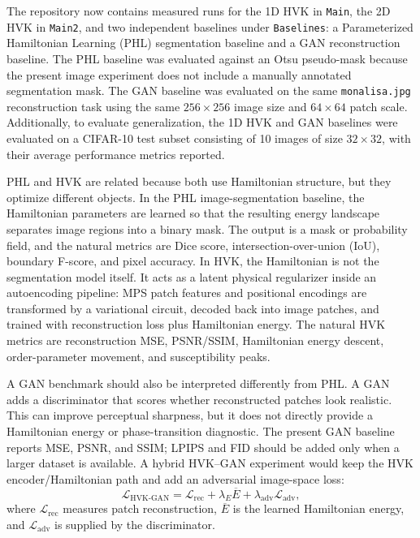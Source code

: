 \documentclass[11pt]{article}
\begin{document}
The repository now contains measured runs for the 1D HVK in \texttt{Main}, the 2D HVK in \texttt{Main2}, and two independent baselines under \texttt{Baselines}: a Parameterized Hamiltonian Learning (PHL) segmentation baseline and a GAN reconstruction baseline. The PHL baseline was evaluated against an Otsu pseudo-mask because the present image experiment does not include a manually annotated segmentation mask. The GAN baseline was evaluated on the same \texttt{monalisa.jpg} reconstruction task using the same $256\times256$ image size and $64\times64$ patch scale. Additionally, to evaluate generalization, the 1D HVK and GAN baselines were evaluated on a CIFAR-10 test subset consisting of 10 images of size $32\times32$, with their average performance metrics reported.

PHL and HVK are related because both use Hamiltonian structure, but they optimize different objects. In the PHL image-segmentation baseline, the Hamiltonian parameters are learned so that the resulting energy landscape separates image regions into a binary mask. The output is a mask or probability field, and the natural metrics are Dice score, intersection-over-union (IoU), boundary F-score, and pixel accuracy. In HVK, the Hamiltonian is not the segmentation model itself. It acts as a latent physical regularizer inside an autoencoding pipeline: MPS patch features and positional encodings are transformed by a variational circuit, decoded back into image patches, and trained with reconstruction loss plus Hamiltonian energy. The natural HVK metrics are reconstruction MSE, PSNR/SSIM, Hamiltonian energy descent, order-parameter movement, and susceptibility peaks.

A GAN benchmark should also be interpreted differently from PHL. A GAN adds a discriminator that scores whether reconstructed patches look realistic. This can improve perceptual sharpness, but it does not directly provide a Hamiltonian energy or phase-transition diagnostic. The present GAN baseline reports MSE, PSNR, and SSIM; LPIPS and FID should be added only when a larger dataset is available. A hybrid HVK--GAN experiment would keep the HVK encoder/Hamiltonian path and add an adversarial image-space loss:
\begin{equation}
\mathcal{L}_{\mathrm{HVK\text{-}GAN}}
=
\mathcal{L}_{\mathrm{rec}}
+ \lambda_E \overline{E}
+ \lambda_{\mathrm{adv}}\mathcal{L}_{\mathrm{adv}},
\end{equation}
where $\mathcal{L}_{\mathrm{rec}}$ measures patch reconstruction, $\overline{E}$ is the learned Hamiltonian energy, and $\mathcal{L}_{\mathrm{adv}}$ is supplied by the discriminator.
\end{document}
